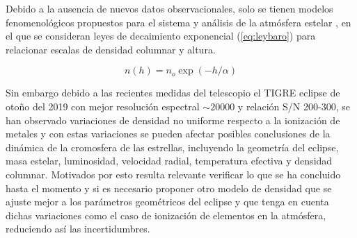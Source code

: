 \documentclass[11pt]{article}
\begin{document}

Debido a la ausencia de nuevos datos observacionales, solo se tienen modelos fenomenológicos propuestos para el sistema \cite{kps9} y  análisis de la atmósfera estelar \cite{kps1O}, \cite{complete} en el que se consideran leyes de decaimiento exponencial (\ref{eq:leybaro}) para relacionar escalas de densidad columnar y altura. 

\begin{equation}
    n(h) = n_o \exp{(-h/\alpha)}
    \label{eq:leybaro}
\end{equation}

Sin embargo debido a las recientes medidas del telescopio el TIGRE  eclipse de otoño del 2019 con mejor resolución espectral $\sim 20000$ y relación S/N 200-300, se han observado variaciones de densidad no uniforme respecto a la ionización de metales y con estas variaciones se pueden afectar posibles conclusiones de la dinámica de la cromosfera de las estrellas, incluyendo la geometría del eclipse, masa estelar, luminosidad, velocidad radial, temperatura efectiva y densidad columnar. Motivados por esto resulta relevante verificar lo que se ha concluido hasta el momento y si es necesario proponer otro modelo de densidad que se ajuste mejor a los parámetros geométricos del eclipse y que tenga en cuenta dichas variaciones como el caso de ionización de elementos en la atmósfera, reduciendo así las incertidumbres.

\end{document}
